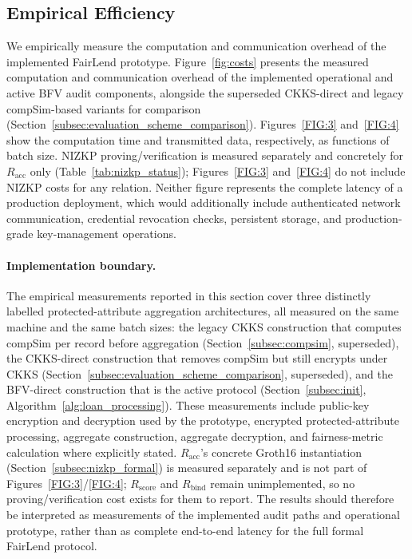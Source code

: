 \documentclass[a4paper,fleqn]{cas-dc}
\begin{document}
\subsection{Empirical Efficiency}
\label{subsec:empirical_efficiency}

We empirically measure the computation and communication overhead of the implemented FairLend prototype. Figure~\ref{fig:costs} presents the measured computation and communication overhead of the implemented operational and active BFV audit components, alongside the superseded CKKS-direct and legacy compSim-based variants for comparison (Section~\ref{subsec:evaluation_scheme_comparison}). Figures~\ref{FIG:3} and~\ref{FIG:4} show the computation time and transmitted data, respectively, as functions of batch size. NIZKP proving/verification is measured separately and concretely for $R_{\mathrm{acc}}$ only (Table~\ref{tab:nizkp_status}); Figures~\ref{FIG:3} and~\ref{FIG:4} do not include NIZKP costs for any relation. Neither figure represents the complete latency of a production deployment, which would additionally include authenticated network communication, credential revocation checks, persistent storage, and production-grade key-management operations.


\paragraph{Implementation boundary.} The empirical measurements reported in this section cover three distinctly labelled protected-attribute aggregation architectures, all measured on the same machine and the same batch sizes: the legacy CKKS construction that computes \textsf{compSim} per record before aggregation (Section~\ref{subsec:compsim}, superseded), the CKKS-direct construction that removes \textsf{compSim} but still encrypts under CKKS (Section~\ref{subsec:evaluation_scheme_comparison}, superseded), and the BFV-direct construction that is the active protocol (Section~\ref{subsec:init}, Algorithm~\ref{alg:loan_processing}). These measurements include public-key encryption and decryption used by the prototype, encrypted protected-attribute processing, aggregate construction, aggregate decryption, and fairness-metric calculation where explicitly stated. $R_{\mathrm{acc}}$'s concrete Groth16 instantiation (Section~\ref{subsec:nizkp_formal}) is measured separately and is not part of Figures~\ref{FIG:3}/\ref{FIG:4}; $R_{\mathrm{score}}$ and $R_{\mathrm{bind}}$ remain unimplemented, so no proving/verification cost exists for them to report. The results should therefore be interpreted as measurements of the implemented audit paths and operational prototype, rather than as complete end-to-end latency for the full formal FairLend protocol.
\end{document}
